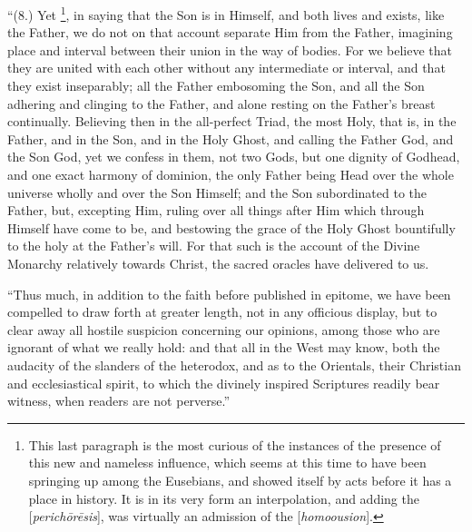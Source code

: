 ``(8.) Yet \footnote{This last paragraph is the most curious of the instances of the
presence of this new and nameless influence, which seems at this time
to have been springing up among the Eusebians, and showed itself by
acts before it has a place in history. It is in its very form an
interpolation, and adding the [\emph{perich\={o}r\={e}sis}], was
virtually an admission of the [\emph{homoousion}].}, in saying that the Son is in Himself, and both lives and
exists, like the Father, we do not on that account separate Him from
the Father, imagining place and interval between their union in the
way of bodies. For we believe that they are united with each other
without any intermediate or interval, and that they exist inseparably;
all the Father embosoming the Son, and all the Son adhering and
clinging to the Father, and alone resting on the Father's breast
continually. Believing then in the all-perfect Triad, the most Holy,
that is, in the Father, and in the Son, and in the Holy Ghost, and
calling the Father God, and the Son God, yet we confess in them, not
two Gods, but one dignity of Godhead, and one exact harmony of
dominion, the only Father being Head over the whole universe wholly
and over the Son Himself; and the Son subordinated to the Father, but,
excepting Him, ruling over all things after Him which through Himself
have come to be, and bestowing the grace of the Holy Ghost
bountifully to the holy at the Father's will. For that such is the
account of the Divine Monarchy relatively towards Christ, the sacred
oracles have delivered to us.

``Thus much, in addition to the
faith before published in epitome, we have been compelled to draw
forth at greater length, not in any officious display, but to clear
away all hostile suspicion concerning our opinions, among those who
are ignorant of what we really hold: and that all in the West may
know, both the audacity of the slanders of the heterodox, and as to
the Orientals, their Christian and ecclesiastical spirit, to which the
divinely inspired Scriptures readily bear witness, when readers are
not perverse.''

